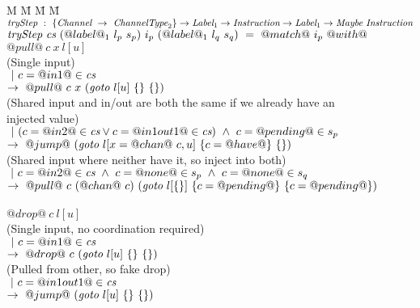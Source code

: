 \newcommand\note[1]{\textcolor{notec}{(#1)}}

\begin{figure}

\newcommand\goto[3]{\ti{goto}~#1~#2~#3}

\begin{tabbing}
M \= M \= M \= M \kill
$\textit{tryStep} ~:~ \{\textit{Channel} ~\to~ \textit{ChannelType}_2\} \to \textit{Label}_1 \to \textit{Instruction} \to \textit{Label}_1 \to \textit{Maybe}~\textit{Instruction}$ \\
$\textit{tryStep} ~\textit{cs}~(@label@_1~l_p~s_p)~i_p~(@label@_1~l_q~s_q)~=~@match@~i_p~@with@$ \\

\> $@pull@~c~x~l[u]$ \\
\> \> \note{Single input}\\
\> \> $~|~c=@in1@\in\textit{cs}$ \\
\> \> $\to~@pull@~c~x~(\goto{l[u]}{\sgl{}}{\sgl{}}) $ \\

\> \> \note{Shared input and in/out are both the same if we already have an injected value}\\
\> \> $~|~(c=@in2@\in\textit{cs} \vee c=@in1out1@\in\textit{cs}) ~\wedge~ c=@pending@ \in s_p$ \\
\> \> $\to~@jump@~(\goto{l[x=@chan@~c,u]}{\sgl{c=@have@}}{\sgl{}}) $ \\

\> \> \note{Shared input where neither have it, so inject into both}\\
\> \> $~|~c=@in2@\in\textit{cs} ~\wedge~ c=@none@ \in s_p ~\wedge~ c=@none@ \in s_q$ \\
\> \> $\to~@pull@~c~(@chan@~c)~(\goto{l[\sgl{}]}{\sgl{c=@pending@}}{\sgl{c=@pending@}}) $ \\
\\

\> $@drop@~c~l[u]$ \\
\> \> \note{Single input, no coordination required} \\
\> \> $~|~c=@in1@\in\textit{cs}$ \\
\> \> $\to~@drop@~c~(\goto{l[u]}{\sgl{}}{\sgl{}}) $ \\

\> \> \note{Pulled from other, so fake drop}\\
\> \> $~|~c=@in1out1@\in\textit{cs}$ \\
\> \> $\to~@jump@~(\goto{l[u]}{\sgl{}}{\sgl{}}) $ \\


\end{tabbing}
\end{figure}
